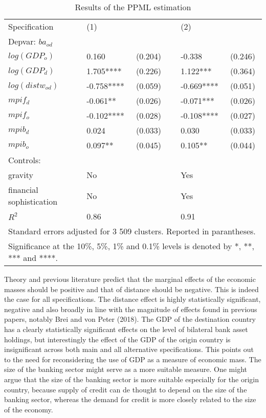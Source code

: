 \documentclass[12pt,a4paper]{article}
\begin{document}
\begin{table}[!h]
\centering
\begin{tabular}{ l l l l l l}
\hline
Specification&(1)&&&(2)& \\
Depvar: $ba_{od}$&&&&&\\
\hline
$log(GDP_{o})$&0.160&(0.204)&&-0.338&(0.246)\\
$log(GDP_{d})$&1.705****&(0.226)&&1.122***&(0.364)\\
$log(distw_{od})$&-0.758****&(0.059)&&-0.669****&(0.051)\\
$mpif_{d}$&-0.061**&(0.026)&&-0.071***&(0.026)\\
$mpif_{o}$&-0.102****&(0.028)&&-0.108****&(0.027)\\
$mpib_{d}$&0.024&(0.033)&&0.030&(0.033)\\
$mpib_{o}$&0.097**&(0.045)&&0.105**&(0.044)\\
Controls:&&&&&\\
gravity &No&&&Yes& \\ 
financial sophistication &No&&&Yes& \\
\hline
$R^2$&0.86&&&0.91&\\
\hline
\multicolumn{6}{l}{Standard errors adjusted for 3 509 clusters. Reported in parantheses. }\\
\hline
\multicolumn{6}{l}{\footnotesize Significance at the 10\%, 5\%, 1\% and 0.1\% levels is denoted by *, **, *** and ****.}\\
\end{tabular}
\caption{Results of the PPML estimation}
\label{tab:results}
\end{table}

Theory and previous literature predict that the marginal effects of the economic masses should be positive and that of distance should be negative. This is indeed the case for all specifications. The distance effect is highly statistically significant, negative and also broadly in line with the magnitude of effects found in previous papers, notably Brei and von Peter (2018). The GDP of the destination country has a clearly statistically significant effects on the level of bilateral bank asset holdings, but interestingly the effect of the GDP of the origin country is insignificant across both main and all alternative specifications. This points out to the need for reconsidering the use of GDP as a measure of economic mass. The size of the banking sector might serve as a more suitable measure. One might argue that the size of the banking sector is more suitable especially for the origin country, because supply of credit can de thought to depend on the size of the banking sector, whereas the demand for credit is more closely related to the size of the economy. 
\end{document}
